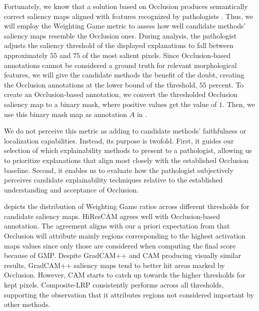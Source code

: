 Fortunately, we know that a solution based on Occlusion produces semantically correct saliency maps aligned with features recognized by pathologists \cite{gallo}.
Thus, we will employ the Weighting Game metric to assess how well candidate methods' saliency maps resemble the Occlusion ones.
During analysis, the pathologist adjusts the saliency threshold of the displayed explanations to fall between approximately $55$ and $75$ of the most salient pixels.
Since Occlusion-based annotations cannot be considered a ground truth for relevant morphological features, we will give the candidate methods the benefit of the doubt, creating the Occlusion annotations at the lower bound of the threshold, $55$ percent.
To create an Occlusion-based annotation, we convert the thresholded Occlusion saliency map to a binary mask, where positive values get the value of $1$.
Then, we use this binary mask map as annotation $A$ in .

We do not perceive this metric as adding to candidate methods' faithfulness or localization capabilities.
Instead, its purpose is twofold.
First, it guides our selection of which explainability methods to present to a pathologist, allowing us to prioritize explanations that align most closely with the established Occlusion baseline.
Second, it enables us to evaluate how the pathologist subjectively perceives candidate explainability techniques relative to the established understanding and acceptance of Occlusion.

 depicts the distribution of Weighting Game ratios across different thresholds for candidate saliency maps.
HiResCAM agrees well with Occlusion-based annotation.
The agreement aligns with our a priori expectation from  that Occlusion will attribute mainly regions corresponding to the highest activation maps values since only those are considered when computing the final score because of GMP.
Despite GradCAM++ and CAM producing visually similar results, GradCAM++ saliency maps tend to better hit areas marked by Occlusion.
However, CAM starts to catch up towards the higher thresholds for kept pixels.
Composite-LRP consistently performs across all thresholds, supporting the observation that it attributes regions not considered important by other methods.


